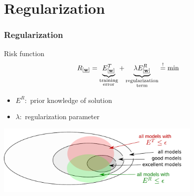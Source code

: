 \section{Regularization}



\begin{frame}\frametitle{Regularization}
	\begin{block}{Risk function}
		\begin{equation*}
			R_{[\underline{\mathbf{w}}]} = \underbrace{ E_{[\underline{\mathbf{w}}]}^T }_{
					\substack{\text{training} \\ \text{error}}}
				+ \underbrace{ \lambda E_{[\underline{\mathbf{w}}]}^R }_{
					\substack{\text{regularization} \\ \text{term}}}
				\stackrel{\mathrm{!}}{=} \min 
		\end{equation*}
		\begin{itemize}
			\item $E^R:$ prior knowledge of solution
			\item $\lambda:$ regularization parameter 
		\end{itemize}
	\end{block}
	
	\begin{center}
		\includegraphics[width=10cm]{img/ModelSelection_models_v2.pdf}
	\end{center}
\end{frame}



